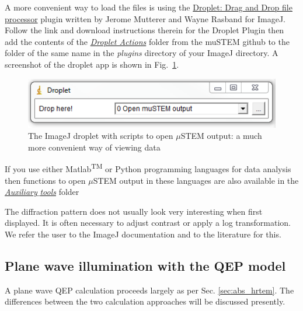 \documentclass[12pt,a4paper]{article}
\begin{document}
A more convenient way to load the files is using the \href{http://imagejdocu.tudor.lu/doku.php?id=plugin:utilities:droplet:start}{Droplet: Drag and Drop file processor} plugin written by Jerome Mutterer and Wayne Rasband for ImageJ. Follow the link and download instructions therein for the Droplet Plugin then add the contents of the \href{https://github.com/HamishGBrown/MuSTEM/tree/master/Auxiliary_tools/Droplet Actions}{\emph{Droplet Actions}} folder from the muSTEM github to the folder of the same name in the \emph{plugins} directory of your ImageJ directory. A screenshot of the droplet app is shown in Fig.~\ref{fig:ImageJ_Droplet}.
\begin{figure}[h!]
	\begin{center}
		\includegraphics[scale=0.75]{ImageJ_droplet.png}
		\caption{The ImageJ droplet with scripts to open $\mu$STEM output: a much more convenient way of viewing data\label{fig:ImageJ_Droplet}}
	\end{center}
\end{figure}

If you use either Matlab\textsuperscript{TM} or Python programming languages for data analysis then functions to open $\mu$STEM output in these languages are also available in the \href{https://github.com/HamishGBrown/MuSTEM/tree/master/Auxiliary_tools}{\emph{Auxiliary$\_$tools}} folder

The diffraction pattern does not usually look very interesting when first displayed.
It is often necessary to adjust contrast or apply a log transformation.
We refer the user to the ImageJ documentation and to the literature for this.

\subsection{Plane wave illumination with the QEP model}
\label{qep_hrtem}

A plane wave QEP calculation proceeds largely as per Sec. \ref{sec:abs_hrtem}. 
The differences between the two calculation approaches will be discussed presently.
\end{document}
